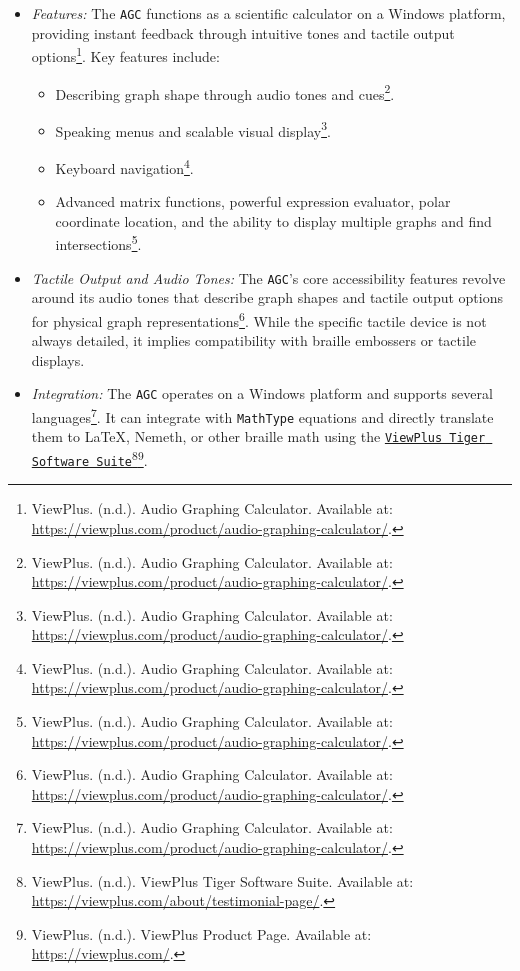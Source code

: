 \begin{itemize}
    \item \emph{Features:} The \texttt{AGC} functions as a scientific calculator on a Windows platform, providing instant feedback through intuitive tones and tactile output options\footnote{ViewPlus. (n.d.). Audio Graphing Calculator. Available at: \url{https://viewplus.com/product/audio-graphing-calculator/}.}. Key features include:
    \begin{itemize}
        \item Describing graph shape through audio tones and cues\footnote{ViewPlus. (n.d.). Audio Graphing Calculator. Available at: \url{https://viewplus.com/product/audio-graphing-calculator/}.}.
        \item Speaking menus and scalable visual display\footnote{ViewPlus. (n.d.). Audio Graphing Calculator. Available at: \url{https://viewplus.com/product/audio-graphing-calculator/}.}.
        \item Keyboard navigation\footnote{ViewPlus. (n.d.). Audio Graphing Calculator. Available at: \url{https://viewplus.com/product/audio-graphing-calculator/}.}.
        \item Advanced matrix functions, powerful expression evaluator, polar coordinate location, and the ability to display multiple graphs and find intersections\footnote{ViewPlus. (n.d.). Audio Graphing Calculator. Available at: \url{https://viewplus.com/product/audio-graphing-calculator/}.}.
    \end{itemize}
    \item \emph{Tactile Output and Audio Tones:} The \texttt{AGC}'s core accessibility features revolve around its audio tones that describe graph shapes and tactile output options for physical graph representations\footnote{ViewPlus. (n.d.). Audio Graphing Calculator. Available at: \url{https://viewplus.com/product/audio-graphing-calculator/}.}. While the specific tactile device is not always detailed, it implies compatibility with braille embossers or tactile displays.
    \item \emph{Integration:} The \texttt{AGC} operates on a Windows platform and supports several languages\footnote{ViewPlus. (n.d.). Audio Graphing Calculator. Available at: \url{https://viewplus.com/product/audio-graphing-calculator/}.}. It can integrate with \texttt{MathType} equations and directly translate them to LaTeX, Nemeth, or other braille math using the \href{https://viewplus.com/about/testimonial-page/}{\texttt{ViewPlus Tiger Software Suite}}\footnote{ViewPlus. (n.d.). ViewPlus Tiger Software Suite. Available at: \url{https://viewplus.com/about/testimonial-page/}.}\footnote{ViewPlus. (n.d.). ViewPlus Product Page. Available at: \url{https://viewplus.com/}.}.
\end{itemize}
